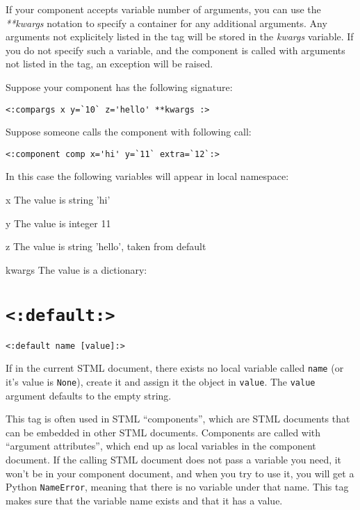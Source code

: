 \documentclass{manual}
\begin{document}
If your component accepts variable number of arguments, you can
use the \emph{**kwargs} notation to specify a container for any 
additional arguments. Any arguments not explicitely listed in the 
 tag will be stored in the 
\emph{kwargs} variable. 
If you do not specify such a variable, and the component is called
with arguments not listed in the  tag, 
an exception will be raised.

Suppose your component has the following signature:

\begin{verbatim}
<:compargs x y=`10` z='hello' **kwargs :>
\end{verbatim}


Suppose someone calls the component with following call: 

\begin{verbatim}
<:component comp x='hi' y=`11` extra=`12`:>
\end{verbatim}


In this case the following variables will appear in local namespace:
\begin{argdesc}
\item[x] The value is string 'hi'
\item[y] The value is integer 11
\item[z] The value is string 'hello', taken from default 
\item[kwargs] The value is a dictionary: 
\end{argdesc}

 

\section{\texttt{<:default:>}}
\label{tagdefault}

\begin{verbatim}
<:default name [value]:>
\end{verbatim}

If in the current STML document, there exists no local variable called
\texttt{name} (or it's value is \texttt{None}), create it and assign
it the object in \texttt{value}. The \texttt{value} argument defaults
to the empty string.

This tag is often used in STML ``components'', which are STML
documents that can be embedded in other STML documents. Components
are called with ``argument attributes'', which end up as local
variables in the component document. If the calling STML document
does not pass a variable you need, it won't be in your component
document, and when you try to use it, you will get a Python
\texttt{NameError}, meaning that there is no variable under that
name. This tag makes sure that the variable name exists and that
it has a value.
\end{document}
